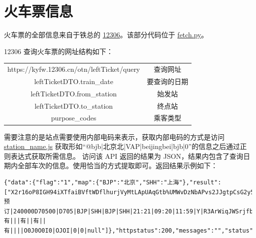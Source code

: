 \documentclass[lang=cn,blue,14pt]{elegantbook}
\begin{document}
\section{火车票信息}
火车票的全部信息来自于铁总的 \href{https://www.12306.cn}{12306}。该部分代码位于 \href{https://github.com/kuso-kodo/kuso_12306/blob/master/src_12306/fetch.py}{fetch.py}。

12306 查询火车票的网址结构如下：
\begin{center}
	\begin{tabular}{cc}
		\hline
		\makebox[0.5\textwidth][c]{参数}	&  \makebox[0.2\textwidth][c]{含义} \\ \hline
		https://kyfw.12306.cn/otn/leftTicket/query & 查询网址 \\
		leftTicketDTO.train\_date & 要查询的日期 \\
		leftTicketDTO.from\_station & 始发站 \\
		leftTicketDTO.to\_station & 终点站 \\
		purpose\_codes & 乘客类型 \\ \hline
	\end{tabular}
\end{center}
需要注意的是站点需要使用内部电码来表示，获取内部电码的方式是访问 \href{https://kyfw.12306.cn/otn/resources/js/framework/station\_name.js}{station\_name.js} 获取形如``@bjb|北京北|VAP|beijingbei|bjb|0''的信息之后通过正则表达式获取所需信息。
访问该 API 返回的结果为 JSON，结果内包含了查询日期内全部车次的信息。使用恰当的方式提取即可。返回结果示例如下：
\begin{lstlisting}[language={}]
{"data":{"flag":"1","map":{"BJP":"北京","SHH":"上海"},"result":["X2r16oP8IGH94iXTfaiBVftWDflhurjVyMtLApUAqGtb%UMWvDzNbAPvs2JJgtpCsG2y5VUJ2l5mC%0AbxIfI7x4izoLOx2%2FQrCgmSw0FTE0HJRw34xqltxHR6QvsJs8ZzcVyUtiZ6O57m%2Btt%2BS7QUfVl23M%0AYkqXZBJdFwX3qw33jZUkU0PLe%2FYfzcinUaZk6VpcbaHLuYoflN4kdE6Vk%2BPrYGpwqehRkGoTElzS%0A8naAdzOg1VyR8vffGyFCZ%2B4F9ZbIMrm0Hm1cVV%2BA2RsOgIps8IwLambwpZ76GgZZRZj0O6%2B0TkGY%0AG8DGrhYOPKg%3D|预订|240000D70500|D705|BJP|SHH|BJP|SHH|21:21|09:20|11:59|Y|R3ArWiqJWSrjfblWAofOiX3%2Bo5Q7Ud8vVMTg1pnCJxohcTRTmikvHJ7nmlo%3D|20190530|3|P4|01|04|0|0||||有|||有||有||有||||O0J0O0I0|OJOI|0|0|null"]},"httpstatus":200,"messages":"","status":true}
\end{lstlisting}
\end{document}

